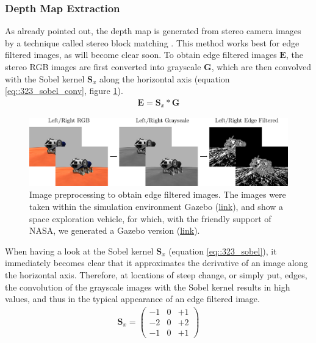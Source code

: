 \subsubsection{Depth Map Extraction}
As already pointed out, the depth map is generated from stereo camera images by a technique called stereo block matching \cite{hamzah2010sum}. This method works best for edge filtered images, as will become clear soon. To obtain edge filtered images $\bm{E}$, the stereo RGB images are first converted into grayscale $\bm{G}$, which are then convolved with the Sobel kernel $\bm{S}_x$ along the horizontal axis \cite{sobel2014an} (equation \ref{eq::323_sobel_conv}, figure \ref{fig::323_image_preprocessing}). 
\begin{align}
	\bm{E} = \bm{S}_x*\bm{G}
	\label{eq::323_sobel_conv}
\end{align}
\begin{figure}[h]
	\centering
	\includegraphics[scale=.28]{chapters/03_background/img/image_preprocessing.png}
	\caption{Image preprocessing to obtain edge filtered images. The images were taken within the simulation environment Gazebo (\href{http://gazebosim.org/}{link}), and show a space exploration vehicle, for which, with the friendly support of NASA, we generated a Gazebo version (\href{https://github.com/mhubii/gazebo_models}{link}).}
	\label{fig::323_image_preprocessing}
\end{figure}
When having a look at the Sobel kernel $\bm{S}_x$ (equation \ref{eq::323_sobel}), it immediately becomes clear that it approximates the derivative of an image along the horizontal axis. Therefore, at locations of steep change, or simply put, edges, the convolution of the grayscale images with the Sobel kernel results in high values, and thus in the typical appearance of an edge filtered image.
\begin{align}
	\bm{S}_x=
	\begin{pmatrix}
		-1 & 0 & +1 \\
		-2 & 0 & +2 \\
		-1 & 0 & +1
	\end{pmatrix}
	\label{eq::323_sobel}
\end{align}
